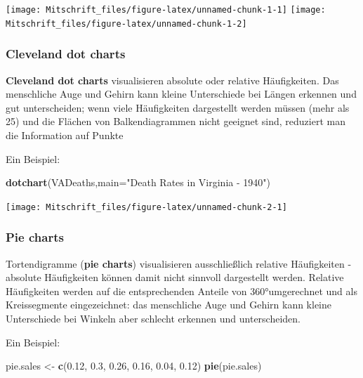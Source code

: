 \documentclass[
]{article}
\newenvironment{Shaded}{\begin{snugshade}}{\end{snugshade}}
\newcommand{\AttributeTok}[1]{\textcolor[rgb]{0.13,0.29,0.53}{#1}}
\newcommand{\FloatTok}[1]{\textcolor[rgb]{0.00,0.00,0.81}{#1}}
\newcommand{\FunctionTok}[1]{\textcolor[rgb]{0.13,0.29,0.53}{\textbf{#1}}}
\newcommand{\NormalTok}[1]{#1}
\newcommand{\OtherTok}[1]{\textcolor[rgb]{0.56,0.35,0.01}{#1}}
\newcommand{\StringTok}[1]{\textcolor[rgb]{0.31,0.60,0.02}{#1}}
\begin{document}
\texttt{[image: Mitschrift\_files/figure-latex/unnamed-chunk-1-1]}
\texttt{[image: Mitschrift\_files/figure-latex/unnamed-chunk-1-2]}

\hypertarget{cleveland-dot-charts}{%
\subsubsection{Cleveland dot charts}\label{cleveland-dot-charts}}

\textbf{Cleveland dot charts} visualisieren absolute oder relative
Häufigkeiten. Das menschliche Auge und Gehirn kann kleine Unterschiede
bei Längen erkennen und gut unterscheiden; wenn viele Häufigkeiten
dargestellt werden müssen (mehr als 25) und die Flächen von
Balkendiagrammen nicht geeignet sind, reduziert man die Information auf
Punkte

Ein Beispiel:

\begin{Shaded}
\begin{Highlighting}[]
\FunctionTok{dotchart}\NormalTok{(VADeaths,}\AttributeTok{main=}\StringTok{"Death Rates in Virginia {-} 1940"}\NormalTok{)}
\end{Highlighting}
\end{Shaded}

\begin{center}\texttt{[image: Mitschrift\_files/figure-latex/unnamed-chunk-2-1]} \end{center}

\hypertarget{pie-charts}{%
\subsubsection{Pie charts}\label{pie-charts}}

Tortendigramme (\textbf{pie charts}) visualisieren ausschließlich
relative Häufigkeiten - absolute Häufigkeiten können damit nicht
sinnvoll dargestellt werden. Relative Häufigkeiten werden auf die
entsprechenden Anteile von 360°umgerechnet und als Kreissegmente
eingezeichnet: das menschliche Auge und Gehirn kann kleine Unterschiede
bei Winkeln aber schlecht erkennen und unterscheiden.

Ein Beispiel:

\begin{Shaded}
\begin{Highlighting}[]
\NormalTok{pie.sales }\OtherTok{\textless{}{-}} \FunctionTok{c}\NormalTok{(}\FloatTok{0.12}\NormalTok{, }\FloatTok{0.3}\NormalTok{, }\FloatTok{0.26}\NormalTok{, }\FloatTok{0.16}\NormalTok{, }\FloatTok{0.04}\NormalTok{, }\FloatTok{0.12}\NormalTok{)}
\FunctionTok{pie}\NormalTok{(pie.sales)}
\end{Highlighting}
\end{Shaded}
\end{document}
